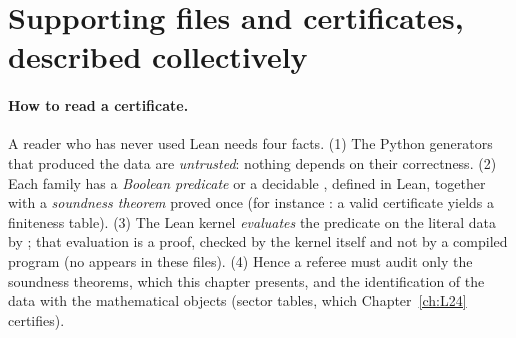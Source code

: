 \section{Supporting files and certificates, described collectively}\label{l26:sec:certs}

\paragraph{How to read a certificate.} A reader who has never used Lean needs four facts. (1) The Python generators
that produced the data are \emph{untrusted}: nothing depends on their correctness.
(2) Each family has a \emph{Boolean predicate} or a decidable , defined in Lean, together with a \emph{soundness theorem}
proved once (for instance : a valid certificate yields a finiteness table). (3) The Lean kernel
\emph{evaluates} the predicate on the literal data by ; that evaluation is a proof, checked by the kernel itself
and not by a compiled program (no  appears in these files). (4) Hence a referee must audit only the soundness
theorems, which this chapter presents, and the identification of the data with the mathematical objects (sector tables, which
Chapter~\ref{ch:L24} certifies).

